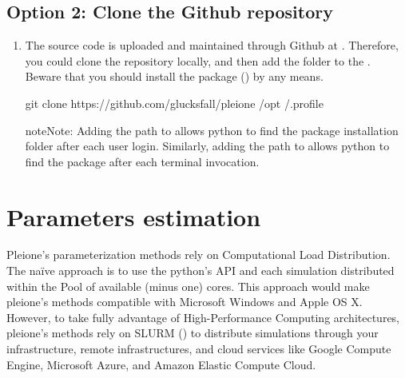 \documentclass[letterpaper,10pt,english]{sphinxmanual}
\begin{document}
\section{Option 2: Clone the Github repository}
\label{\detokenize{Installation:option-2-clone-the-github-repository}}\begin{enumerate}
\def\theenumi{\arabic{enumi}}
\def\labelenumi{\theenumi .}
\makeatletter\def\p@enumii{\p@enumi \theenumi .}\makeatother
\item {} 

The source code is uploaded and maintained through Github at
. Therefore, you could clone the
repository locally, and then add the folder to the . Beware
that you should install the  package () by any means.

\begin{sphinxVerbatim}[commandchars=\\\{\}]
git clone https://github.com/glucksfall/pleione /opt
   \PYGZgt{}\PYGZgt{} /.profile
\end{sphinxVerbatim}

\begin{sphinxadmonition}{note}{Note:}
Adding the path to  allows python to find the package
installation folder after each user login. Similarly, adding the path to
 allows python to find the package after each terminal
invocation.
\end{sphinxadmonition}

\end{enumerate}


\chapter{Parameters estimation}
\label{\detokenize{ParameterEstimation:parameters-estimation}}\label{\detokenize{ParameterEstimation::doc}}
Pleione’s parameterization methods rely on Computational Load Distribution. The
naïve approach is to use the python’s  API and each simulation
distributed within the Pool of available (minus one) cores. This approach would
make pleione’s methods compatible with Microsoft Windows and Apple OS X.
However, to take fully advantage of High-Performance Computing architectures,
pleione’s methods rely on SLURM \textendash{}\textendash{} () to distribute simulations through your infrastructure,
remote infrastructures, and cloud services like Google Compute Engine, Microsoft
Azure, and Amazon Elastic Compute Cloud.
\end{document}

